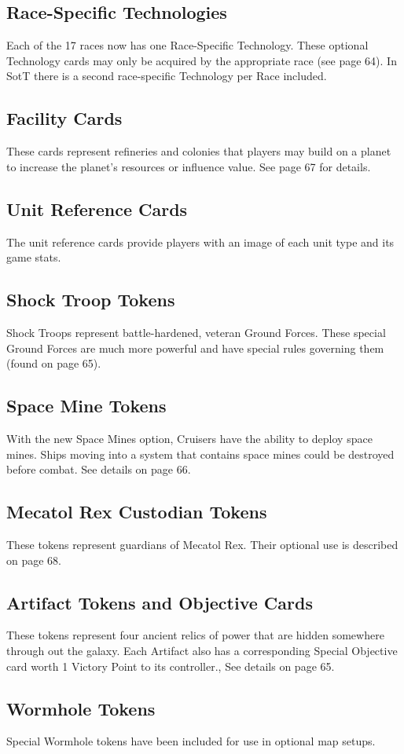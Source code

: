 \documentclass[11pt,fleqn]{book} %
\begin{document}
\begin{SEbox}
    
\subsection{Race-Specific Technologies}
Each of the 17 races now has one Race-Specific Technology. These optional Technology cards may only be acquired by the appropriate race (see page 64). In SotT there is a second race-specific Technology per Race included.

\subsection{Facility Cards}
These cards represent refineries and colonies that players may build on a planet to increase the planet’s resources or influence value. See page 67 for details.

\subsection{Unit Reference Cards}
The unit reference cards provide players with an image of each unit type and its game stats.

\subsection{Shock Troop Tokens}
Shock Troops represent battle-hardened, veteran Ground Forces. These special Ground Forces are much more powerful and have special rules governing them (found on page 65).

\subsection{Space Mine Tokens}
With the new Space Mines option, Cruisers have the ability to deploy space mines. Ships moving into a system that contains space mines could be destroyed before combat. See details on page 66.

\subsection{Mecatol Rex Custodian Tokens}
These tokens represent guardians of Mecatol Rex. Their optional use is described on page 68.

\subsection{Artifact Tokens and Objective Cards}
These tokens represent four ancient relics of power that are hidden somewhere through out the galaxy. Each Artifact also has a corresponding Special Objective card worth 1 Victory Point to its controller., See details on page 65.

\subsection{Wormhole Tokens}
Special Wormhole tokens have been included for use in optional map setups.

\end{SEbox}
\end{document}
